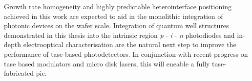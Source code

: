 Growth rate homogeneity and highly predictable heterointerface positioning achieved in this work are expected to aid in the monolithic integration of photonic devices on the wafer scale. Integration of quantum well structures demonstrated in this thesis into the intrinsic region \textit{p} - \textit{i} - \textit{n} photodiodes and in-depth electrooptical characterisation are the natural next step to improve the performance of \acs{tase}-based photodetectors. In conjunction with recent progress on \acs{tase} based modulators and micro disk lasers, this will eneable a fully \acs{tase}-fabricated \acs{pic}.